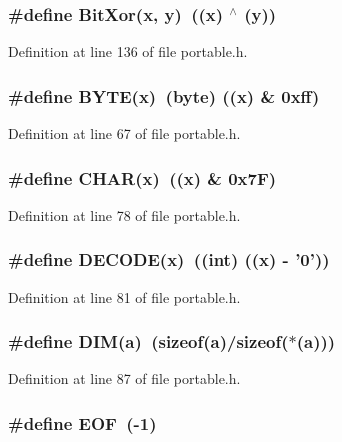 \subsubsection{\setlength{\rightskip}{0pt plus 5cm}\#define Bit\-Xor(x, y)\ ((x) $^\wedge$ (y))}\label{portable_8h_a49}




Definition at line 136 of file portable.h.
\subsubsection{\setlength{\rightskip}{0pt plus 5cm}\#define BYTE(x)\ ({\bf byte}) ((x) \& 0xff)}\label{portable_8h_a1}




Definition at line 67 of file portable.h.
\subsubsection{\setlength{\rightskip}{0pt plus 5cm}\#define CHAR(x)\ ((x) \& 0x7F)}\label{portable_8h_a6}




Definition at line 78 of file portable.h.
\subsubsection{\setlength{\rightskip}{0pt plus 5cm}\#define DECODE(x)\ ((int) ((x) - '0'))}\label{portable_8h_a9}




Definition at line 81 of file portable.h.
\subsubsection{\setlength{\rightskip}{0pt plus 5cm}\#define DIM(a)\ (sizeof(a)/sizeof($\ast$(a)))}\label{portable_8h_a11}




Definition at line 87 of file portable.h.
\subsubsection{\setlength{\rightskip}{0pt plus 5cm}\#define EOF\ (-1)}\label{portable_8h_a69}




